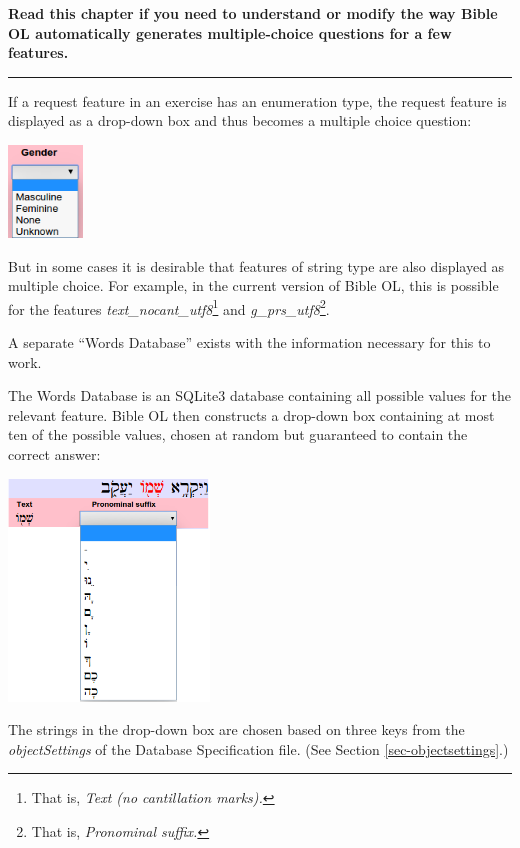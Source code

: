 \documentclass[11pt,oneside,a4paper]{memoir}
\begin{document}
\textbf{Read this chapter if you need to understand or modify the way Bible OL automatically
  generates multiple-choice questions for a few features.}
\plainbreak{3}


If a request feature in an exercise has an enumeration type, the request feature is displayed as a
drop-down box and thus becomes a multiple choice question:

\begin{center}
  \includegraphics[width=0.148\textwidth]{gender.png}
\end{center}

But in some cases it is desirable that features of string type are also displayed as multiple
choice. For example, in the current version of Bible OL, this is possible for the features
\emph{text\_nocant\_utf8}\footnote{That is, \emph{Text (no cantillation marks).}} and
\emph{g\_prs\_utf8}\footnote{That is, \emph{Pronominal suffix.}}.

A separate ``Words Database'' exists with the information necessary for this to work.

The Words Database is an SQLite3 database containing all possible values for the relevant feature.
Bible OL then constructs a drop-down box containing at most ten of the possible values, chosen at
random but guaranteed to contain the correct answer:

\begin{center}
  \includegraphics[width=0.4\textwidth]{pronsuf.png}
\end{center}

The strings in the drop-down box are chosen based on three keys from the \emph{objectSettings} of
the Database Specification file. (See Section \ref{sec-objectsettings}.)
\end{document}
